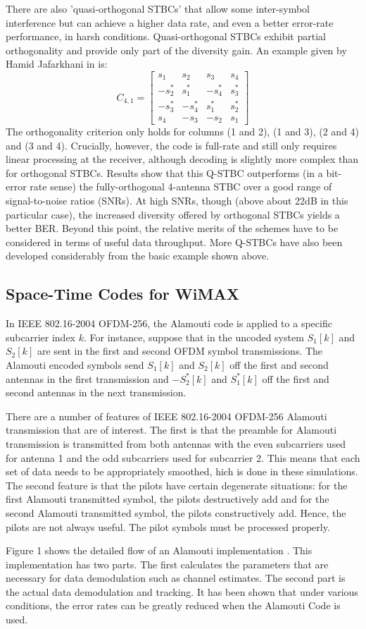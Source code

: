 \documentclass{book}
\begin{document}
There are also 'quasi-orthogonal STBCs' that allow some inter-symbol interference but can achieve a higher data rate, and even a better error-rate performance, in harsh conditions. Quasi-orthogonal STBCs exhibit partial orthogonality and provide only part of the diversity gain. An example given by Hamid Jafarkhani in \cite{20} is:
\[
C_{4,1}=\left[\begin{array}{cccc}
s_1 & s_2 & s_3 & s_4\\
-s^*_2 & s^*_1 & -s^*_4 & s^*_3\\
-s^*_3 & -s^*_4 & s^*_1 & s^*_2\\
s_4 & -s_3 & -s_2 & s_1
\end{array} \right]
\]
The orthogonality criterion only holds for columns (1 and 2), (1 and 3), (2 and 4) and (3 and 4). Crucially, however, the code is full-rate and still only requires linear processing at the receiver, although decoding is slightly more complex than for orthogonal STBCs. Results show that this Q-STBC outperforms (in a bit-error rate sense) the fully-orthogonal 4-antenna STBC over a good range of signal-to-noise ratios (SNRs). At high SNRs, though (above about 22dB in this particular case), the increased diversity offered by orthogonal STBCs yields a better BER. Beyond this point, the relative merits of the schemes have to be considered in terms of useful data throughput. More Q-STBCs have also been developed considerably from the basic example shown above.
\subsection{Space-Time Codes for WiMAX}
In IEEE 802.16-2004 OFDM-256, the Alamouti code is applied to a specific subcarrier index $k$. For instance, suppose that in the uncoded system $S_1[k]$ and $S_2[k]$ are sent in the first and second OFDM symbol transmissions.  The Alamouti encoded symbols send $S_1[k]$ and $S_2[k]$ off the first and second antennas in the first transmission and $-S_2^*[k]$ and $S_1^*[k]$ off the first and second antennas in the next transmission.

There are a number of features of IEEE 802.16-2004 OFDM-256 Alamouti transmission that are of interest.  The first is that the preamble for Alamouti transmission is transmitted from both antennas with the even subcarriers used for antenna 1 and the odd subcarriers used for subcarrier 2. This means that each set of data needs to be appropriately smoothed, hich is done in these simulations. The second feature is that the pilots have certain degenerate situations: for the first Alamouti transmitted symbol, the pilots destructively add and for the second Alamouti transmitted symbol, the pilots constructively add. Hence, the pilots are not always useful. The pilot symbols must be processed properly.

Figure 1 shows the detailed flow of an Alamouti implementation \cite{21}. This implementation has two parts. The first calculates the parameters that are necessary for data demodulation such as channel estimates. The second part is the actual data demodulation and tracking.
It has been shown that under various conditions, the error rates can be greatly reduced when the Alamouti Code is used.
\end{document}
